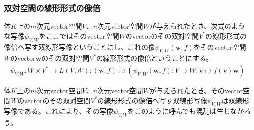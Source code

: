 \documentclass[dvipdfmx]{jsarticle}
\begin{document}
\subsubsection{双対空間の線形形式の像倍}%
\begin{dfn}
体$K$上の$m$次元vector空間$V$、$n$次元vector空間$W$が与えられたとき、次式のような写像$\psi_{V,W}$をここではそのvector空間$W$のvectorのその双対空間$V^{*}$の線形形式の像倍へ写す双線形写像ということにし、これの像$\psi_{V,W}\left( \mathbf{w},f \right)$をそのvector空間$W$のvector$\mathbf{w}$のその双対空間$V^{*}$の線形形式の像倍ということにする。
\begin{align*}
\psi_{V,W}:W \times V^{*} \rightarrow L(V,W);\left( \mathbf{w},f \right) \mapsto \left( \psi_{V,W}\left( \mathbf{w},f \right):V \rightarrow W;\mathbf{v} \mapsto f\left( \mathbf{v} \right)\mathbf{w} \right)
\end{align*}
\end{dfn}
\begin{thm}\label{2.4.5.6}
体$K$上の$m$次元vector空間$V$、$n$次元vector空間$W$が与えられたとき、そのvector空間$W$のvectorのその双対空間$V^{*}$の線形形式の像倍へ写す双線形写像$\psi_{V,W}$は双線形写像である。これにより、その写像$\psi_{V,W}$をこのように呼んでも混乱は生じなかろう。
\end{thm}
\end{document}
